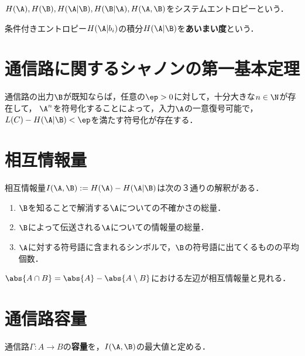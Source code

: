 \documentclass[uplatex,dvipdfmx]{jsreport}
\begin{document}
\begin{tcolorbox}[colframe=ForestGreen, colback=ForestGreen!10!white,breakable,colbacktitle=ForestGreen!40!white,coltitle=black,fonttitle=\bfseries\sffamily,
title=]
    $H(\A),H(\B),H(\A|\B),H(\B|\A),H(\A,\B)$をシステムエントロピーという．
\end{tcolorbox}

\begin{discussion}[equivocation]
    条件付きエントロピー$H(\A|b_i)$の積分$H(\A|\B)$を\textbf{あいまい度}という．
\end{discussion}

\section{通信路に関するシャノンの第一基本定理}

\begin{theorem}
    通信路の出力$\B$が既知ならば，任意の$\ep>0$に対して，十分大きな$n\in\N$が存在して，
    $\A^n$を符号化することによって，入力$\A$の一意復号可能で，$L(C)-H(\A|\B)<\ep$を満たす符号化が存在する．
\end{theorem}

\section{相互情報量}

\begin{discussion}
    相互情報量$I(\A,\B):=H(\A)-H(\A|\B)$は次の３通りの解釈がある．
    \begin{enumerate}
        \item $\B$を知ることで解消する$\A$についての不確かさの総量．
        \item $\B$によって伝送される$\A$についての情報量の総量．
        \item $\A$に対する符号語に含まれるシンボルで，$\B$の符号語に出てくるものの平均個数．
    \end{enumerate}
\end{discussion}
\begin{remarks}[数え上げ測度の例]
    $\abs{A\cap B}=\abs{A}-\abs{A\setminus B}$における左辺が相互情報量と見れる．
\end{remarks}

\section{通信路容量}

\begin{definition}[capacity]
    通信路$\Gamma:A\to B$の\textbf{容量}を，$I(\A,\B)$の最大値と定める．
\end{definition}
\end{document}

